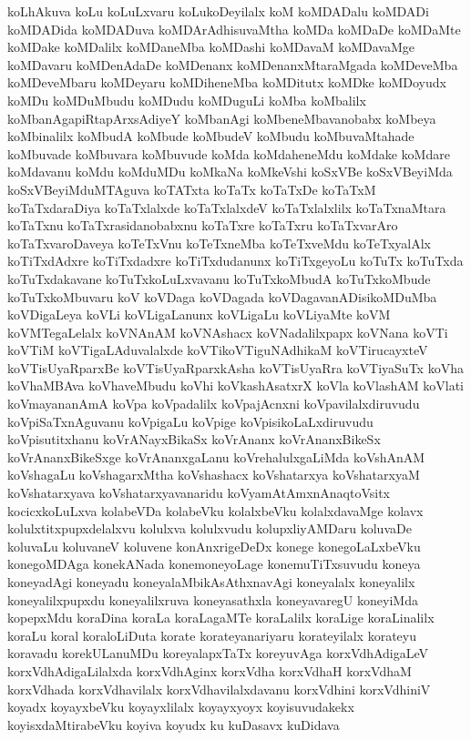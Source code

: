 {koLhAkuva
koLu
koLuLxvaru
koLukoDeyilalx
koM
koMDADalu
koMDADi
koMDADida
koMDADuva
koMDArAdhisuvaMtha
koMDa
koMDaDe
koMDaMte
koMDake
koMDalilx
koMDaneMba
koMDashi
koMDavaM
koMDavaMge
koMDavaru
koMDenAdaDe
koMDenanx
koMDenanxMtaraMgada
koMDeveMba
koMDeveMbaru
koMDeyaru
koMDiheneMba
koMDitutx
koMDke
koMDoyudx
koMDu
koMDuMbudu
koMDudu
koMDuguLi
koMba
koMbalilx
koMbanAgapiRtapArxsAdiyeY
koMbanAgi
koMbeneMbavanobabx
koMbeya
koMbinalilx
koMbudA
koMbude
koMbudeV
koMbudu
koMbuvaMtahade
koMbuvade
koMbuvara
koMbuvude
koMda
koMdaheneMdu
koMdake
koMdare
koMdavanu
koMdu
koMduMDu
koMkaNa
koMkeVshi
koSxVBe
koSxVBeyiMda
koSxVBeyiMduMTAguva
koTATxta
koTaTx
koTaTxDe
koTaTxM
koTaTxdaraDiya
koTaTxlalxde
koTaTxlalxdeV
koTaTxlalxlilx
koTaTxnaMtara
koTaTxnu
koTaTxrasidanobabxnu
koTaTxre
koTaTxru
koTaTxvarAro
koTaTxvaroDaveya
koTeTxVnu
koTeTxneMba
koTeTxveMdu
koTeTxyalAlx
koTiTxdAdxre
koTiTxdadxre
koTiTxdudanunx
koTiTxgeyoLu
koTuTx
koTuTxda
koTuTxdakavane
koTuTxkoLuLxvavanu
koTuTxkoMbudA
koTuTxkoMbude
koTuTxkoMbuvaru
koV
koVDaga
koVDagada
koVDagavanADisikoMDuMba
koVDigaLeya
koVLi
koVLigaLanunx
koVLigaLu
koVLiyaMte
koVM
koVMTegaLelalx
koVNAnAM
koVNAshacx
koVNadalilxpapx
koVNana
koVTi
koVTiM
koVTigaLAduvalalxde
koVTikoVTiguNAdhikaM
koVTirucayxteV
koVTisUyaRparxBe
koVTisUyaRparxkAsha
koVTisUyaRra
koVTiyaSuTx
koVha
koVhaMBAva
koVhaveMbudu
koVhi
koVkashAsatxrX
koVla
koVlashAM
koVlati
koVmayananAmA
koVpa
koVpadalilx
koVpajAcnxni
koVpavilalxdiruvudu
koVpiSaTxnAguvanu
koVpigaLu
koVpige
koVpisikoLaLxdiruvudu
koVpisutitxhanu
koVrANayxBikaSx
koVrAnanx
koVrAnanxBikeSx
koVrAnanxBikeSxge
koVrAnanxgaLanu
koVrehalulxgaLiMda
koVshAnAM
koVshagaLu
koVshagarxMtha
koVshashacx
koVshatarxya
koVshatarxyaM
koVshatarxyava
koVshatarxyavanaridu
koVyamAtAmxnAnaqtoVsitx
kocicxkoLuLxva
kolabeVDa
kolabeVku
kolalxbeVku
kolalxdavaMge
kolavx
kolulxtitxpupxdelalxvu
kolulxva
kolulxvudu
kolupxliyAMDaru
koluvaDe
koluvaLu
koluvaneV
koluvene
konAnxrigeDeDx
konege
konegoLaLxbeVku
konegoMDAga
konekANada
konemoneyoLage
konemuTiTxsuvudu
koneya
koneyadAgi
koneyadu
koneyalaMbikAsAthxnavAgi
koneyalalx
koneyalilx
koneyalilxpupxdu
koneyalilxruva
koneyasathxla
koneyavaregU
koneyiMda
kopepxMdu
koraDina
koraLa
koraLagaMTe
koraLalilx
koraLige
koraLinalilx
koraLu
koral
koraloLiDuta
korate
korateyanariyaru
korateyilalx
korateyu
koravadu
korekULanuMDu
koreyalapxTaTx
koreyuvAga
korxVdhAdigaLeV
korxVdhAdigaLilalxda
korxVdhAginx
korxVdha
korxVdhaH
korxVdhaM
korxVdhada
korxVdhavilalx
korxVdhavilalxdavanu
korxVdhini
korxVdhiniV
koyadx
koyayxbeVku
koyayxlilalx
koyayxyoyx
koyisuvudakekx
koyisxdaMtirabeVku
koyiva
koyudx
ku
kuDasavx
kuDidava
}
